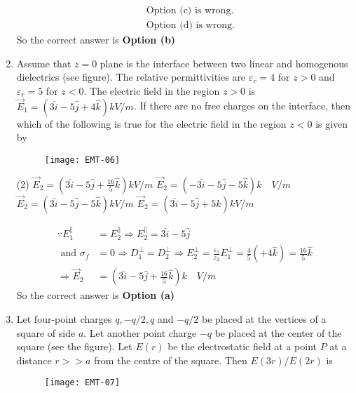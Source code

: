 \begin{enumerate}
\begin{answer}
$$\begin{aligned}
&\text{	Option (c) is wrong.}\\
&\text{	Option (d) is wrong.}
\end{aligned}
$$
So the correct answer is \textbf{Option (b)}
\end{answer}
\item 	 Assume that $z=0$ plane is the interface between two linear and homogenous dielectrics (see figure). The relative permittivities are $\varepsilon_{r}=4$ for $z>0$ and $\varepsilon_{r}=5$ for $z<0$. The electric field in the region $z>0$ is $\vec{E}_{1}=(3 \hat{i}-5 \hat{j}+4 \hat{k}) k V / m$. If there are no free charges on the interface, then which of the following is true for the electric field in the region $z<0$ is given by
\begin{figure}[H]
	\centering
	\texttt{[image: EMT-06]}
\end{figure}
 \begin{tasks}(2)
	\task[\textbf{a.}]$\vec{E}_{2}=\left(3 \hat{i}-5 \hat{j}+\frac{16}{5} \hat{k}\right) k V / m$
	\task[\textbf{b.}]$\vec{E}_{2}=(-3 \hat{i}-5 \hat{j}-5 \hat{k}) k \quad V / m$	
	\task[\textbf{c.}]$\vec{E}_{2}=(3 \hat{i}-5 \hat{j}-5 \hat{k}) k V / m$
	\task[\textbf{d.}] $\vec{E}_{2}=(3 \hat{i}-5 \hat{j}+5 \hat{k}) k V / m$	
\end{tasks}	
\begin{answer}
	$$
	\begin{aligned}
	\because E_{1}^{\parallel}&=E_{2}^{\parallel} \Rightarrow E_{2}^{\parallel}=3 \hat{i}-5 \hat{j}\\
	\text { and } \sigma_{f}&=0 \Rightarrow D_{1}^{\perp}=D_{2}^{\perp} \Rightarrow E_{2}^{\perp}=\frac{\varepsilon_{1}}{\varepsilon_{2}} E_{1}^{\perp}=\frac{4}{5}(+4 \hat{k})=\frac{16}{5} \hat{k}\\
	\Rightarrow \vec{E}_{2}&=\left(3 \hat{i}-5 \hat{j}+\frac{16}{5} \hat{k}\right) k \quad V / m
\end{aligned}
$$
So the correct answer is \textbf{Option (a)}
\end{answer}
\item  Let four-point charges $q,-q / 2, q$ and $-q / 2$ be placed at the vertices of a square of side $a$. Let another point charge $-q$ be placed at the center of the square (see the figure).	
Let $E(r)$ be the electrostatic field at a point $P$ at a distance $r>>a$ from the centre of the square. Then $E(3 r) / E(2 r)$ is
\begin{figure}[H]
	\centering
	\texttt{[image: EMT-07]}
\end{figure}

\end{enumerate}
